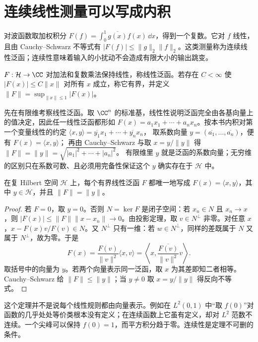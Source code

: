 \section{连续线性测量可以写成内积}

对波函数取加权积分 \(F(f)=\int_0^1\overline{g(x)}f(x)\,\dd x\)，得到一个复数。它对 \(f\) 线性，且由 Cauchy--Schwarz 不等式有 \(|F(f)|\le\|g\|_2\|f\|_2\)。这类测量称为连续线性泛函；连续性意味着输入的小扰动不会造成有限大小的输出跳变。

\begin{definition}[线性泛函及其范数]
\(F:\mathcal H\to\CC\) 对加法和复数乘法保持线性，称线性泛函。若存在 \(C<\infty\) 使 \(|F(x)|\le C\|x\|\) 对所有 \(x\) 成立，称它有界，并定义 \(\|F\|=\sup_{\|x\|\le1}|F(x)|\)。
\end{definition}

先在有限维考察线性泛函。取 \(\CC^n\) 的标准基，线性性说明泛函完全由各基向量上的值决定，因此任一线性泛函都形如
\(F(x)=a_1x_1+\cdots+a_nx_n\)。按本书内积对第一个变量线性的约定
\(\langle x,y\rangle=\overline{y_1}x_1+\cdots+\overline{y_n}x_n\)，
取系数向量 \(y=(\overline{a_1},\ldots,\overline{a_n})\)，便有 \(F(x)=\langle x,y\rangle\)；
再由 Cauchy--Schwarz 与取 \(x=y/\|y\|\) 得
\(\|F\|=\|y\|=\sqrt{|a_1|^2+\cdots+|a_n|^2}\)。
有限维里 \(y\) 就是泛函的系数向量；无穷维的区别只在系数可数、且必须用完备性保证这个 \(y\) 确实存在于 \(\mathcal H\) 中。

\begin{theorem}
在复 Hilbert 空间 \(\mathcal H\) 上，每个有界线性泛函 \(F\) 都唯一地写成 \(F(x)=\langle x,y\rangle\)，其中 \(y\in\mathcal H\)，并且 \(\|F\|=\|y\|\)。
\end{theorem}
\begin{proof}
若 \(F=0\)，取 \(y=0\)。否则 \(N=\ker F\) 是闭子空间：若 \(x_n\in N\) 且 \(x_n\to x\)，则 \(|F(x)|\le\|F\|\|x-x_n\|\to0\)。由投影定理，取 \(v\in N^\perp\) 非零。对任意 \(x\)，\(x-F(x)v/F(v)\in N\)。又 \(N^\perp\) 只有一维：若 \(w\in N^\perp\)，同样的差既属于 \(N\) 又属于 \(N^\perp\)，故为零。于是
\[
F(x)=\frac{F(v)}{\|v\|^2}\langle x,v\rangle
=\left\langle x,\frac{\overline{F(v)}}{\|v\|^2}v\right\rangle.
\]
取括号中的向量为 \(y\)。若两个向量表示同一泛函，取 \(x\) 为其差即知二者相等。Cauchy--Schwarz 给 \(\|F\|\le\|y\|\)；当 \(y\ne0\) 取 \(x=y/\|y\|\) 得反向不等式。
\end{proof}

这个定理并不是说每个线性规则都由向量表示。例如在 \(L^2(0,1)\) 中“取 \(f(0)\)”对函数的几乎处处等价类根本没有定义；在连续函数上它虽有定义，却对 \(L^2\) 范数不连续。一个尖峰可以保持 \(f(0)=1\)，而平方积分趋于零。连续性是定理不可删的条件。

